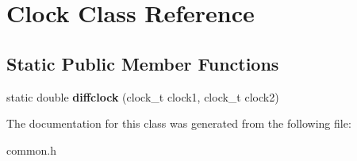 \hypertarget{classClock}{
\section{Clock Class Reference}
\label{classClock}
}
\subsection*{Static Public Member Functions}
\begin{DoxyCompactItemize}
\item 
\hypertarget{classClock_af45b8db844300755b8c4244a65f60833}{
static double {\bfseries diffclock} (clock\_\-t clock1, clock\_\-t clock2)}
\label{classClock_af45b8db844300755b8c4244a65f60833}

\end{DoxyCompactItemize}


The documentation for this class was generated from the following file:\begin{DoxyCompactItemize}
\item 
common.h\end{DoxyCompactItemize}
